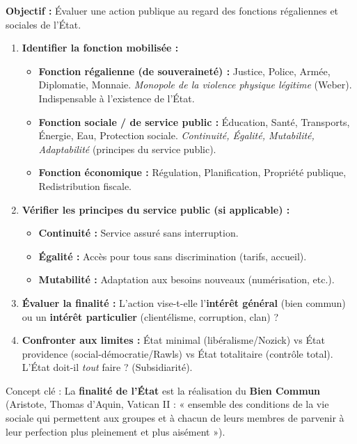 \documentclass[11pt]{article}
\newcommand{\cle}[1]{{\popxbold\color{popdark}#1}}
\begin{document}
\begin{methode}
\textbf{Objectif :} Évaluer une action publique au regard des fonctions régaliennes et sociales de l'État.
\begin{enumerate}
    \item \textbf{Identifier la fonction mobilisée :}
    \begin{itemize}
        \item \textbf{Fonction régalienne (de souveraineté) :} Justice, Police, Armée, Diplomatie, Monnaie. \emph{Monopole de la violence physique légitime} (Weber). Indispensable à l'existence de l'État.
        \item \textbf{Fonction sociale / de service public :} Éducation, Santé, Transports, Énergie, Eau, Protection sociale. \emph{Continuité, Égalité, Mutabilité, Adaptabilité} (principes du service public).
        \item \textbf{Fonction économique :} Régulation, Planification, Propriété publique, Redistribution fiscale.
    \end{itemize}
    \item \textbf{Vérifier les principes du service public (si applicable) :}
    \begin{itemize}
        \item \textbf{Continuité :} Service assuré sans interruption.
        \item \textbf{Égalité :} Accès pour tous sans discrimination (tarifs, accueil).
        \item \textbf{Mutabilité :} Adaptation aux besoins nouveaux (numérisation, etc.).
    \end{itemize}
    \item \textbf{Évaluer la finalité :} L'action vise-t-elle l'\textbf{intérêt général} (bien commun) ou un \textbf{intérêt particulier} (clientélisme, corruption, clan) ?
    \item \textbf{Confronter aux limites :} État minimal (libéralisme/Nozick) vs État providence (social-démocratie/Rawls) vs État totalitaire (contrôle total). L'État doit-il \emph{tout} faire ? (Subsidiarité).
\end{enumerate}
\cle{Concept clé} : La \textbf{finalité de l'État} est la réalisation du \textbf{Bien Commun} (Aristote, Thomas d'Aquin, Vatican II : « ensemble des conditions de la vie sociale qui permettent aux groupes et à chacun de leurs membres de parvenir à leur perfection plus pleinement et plus aisément »).
\end{methode}
\end{document}
